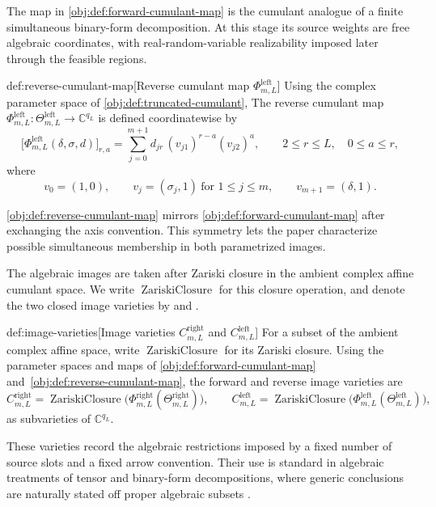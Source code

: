 The map in \cref{obj:def:forward-cumulant-map} is the cumulant analogue of a finite simultaneous binary-form decomposition. At this stage its source weights are free algebraic coordinates, with real-random-variable realizability imposed later through the feasible regions.

\begin{definitionv}{def:reverse-cumulant-map}[Reverse cumulant map \(\Phi^{\mathrm{left}}_{m,L}\)]
Using the complex parameter space of \cref{obj:def:truncated-cumulant}, The reverse cumulant map \(\Phi^{\mathrm{left}}_{m,L}:\Theta^{\mathrm{left}}_{m,L}\to\mathbb C^{q_L}\) is defined coordinatewise by
\[
\bigl[\Phi^{\mathrm{left}}_{m,L}(\delta,\sigma,d)\bigr]_{r,a}
=
\sum_{j=0}^{m+1}
d_{jr}\,(v_{j1})^{r-a}(v_{j2})^a,
\qquad
2\le r\le L,\quad 0\le a\le r,
\]
where
\[
v_0=(1,0),\qquad
v_j=(\sigma_j,1)\ \text{for }1\le j\le m,\qquad
v_{m+1}=(\delta,1).
\]
\end{definitionv}

\cref{obj:def:reverse-cumulant-map} mirrors \cref{obj:def:forward-cumulant-map} after exchanging the axis convention. This symmetry lets the paper characterize possible simultaneous membership in both parametrized images.

The algebraic images are taken after Zariski closure in the ambient complex affine cumulant space. We write \(\operatorname{ZariskiClosure}\) for this closure operation, and denote the two closed image varieties by  and .

\begin{definitionv}{def:image-varieties}[Image varieties \(C^{\mathrm{right}}_{m,L}\) and \(C^{\mathrm{left}}_{m,L}\)]
For a subset of the ambient complex affine space, write \(\operatorname{ZariskiClosure}\) for its Zariski closure. Using the parameter spaces and maps of \cref{obj:def:forward-cumulant-map} and~\cref{obj:def:reverse-cumulant-map}, the forward and reverse image varieties are
\[
C^{\mathrm{right}}_{m,L}
=
\operatorname{ZariskiClosure}
\bigl(\Phi^{\mathrm{right}}_{m,L}(\Theta^{\mathrm{right}}_{m,L})\bigr),
\qquad
C^{\mathrm{left}}_{m,L}
=
\operatorname{ZariskiClosure}
\bigl(\Phi^{\mathrm{left}}_{m,L}(\Theta^{\mathrm{left}}_{m,L})\bigr),
\]
as subvarieties of \(\mathbb C^{q_L}\).
\end{definitionv}

These varieties record the algebraic restrictions imposed by a fixed number of source slots and a fixed arrow convention. Their use is standard in algebraic treatments of tensor and binary-form decompositions, where generic conclusions are naturally stated off proper algebraic subsets \citep{ComonMourrain1996,Landsberg2012}.

